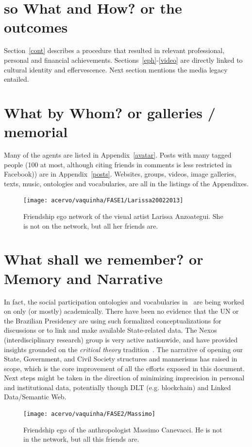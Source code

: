 \documentclass[a4paper]{article}
\begin{document}
\section{so What and How? or the outcomes}
Section~\ref{cont} describes a procedure that resulted in
relevant professional, personal and financial achievements.
Sections~\ref{eph}-\ref{video} are directly linked to cultural identity and effervescence.
Next section mentions the media legacy entailed.

\section{What by Whom? or galleries / memorial}
Many of the agents are listed in Appendix~\ref{avatar}.
Posts with many tagged people (100 at most, although citing friends in comments is less restricted in Facebook)) are in Appendix~\ref{posts}.
Websites, groups, videos, image galleries, texts, music, ontologies and vocabularies, are all in the listings of the Appendixes.

\begin{figure}[!h]
  \centering
    \texttt{[image: acervo/vaquinha/FASE1/Larissa20022013]}
  \caption{Friendship ego network of the visual artist Larissa Anzoategui. She is not on the network, but all her friends are.}
\end{figure}

\section{What shall we remember? or Memory and Narrative}
In fact, the social participation ontologies and vocabularies in~\cite{thesis}
are being worked on only (or mostly) academically.
There have been no evidence that the UN or the Brazilian Presidency are using
such formalized conceptualizations for discussions or to link and make available State-related data.
The Nexos (interdisciplinary research) group is very active nationwide,
and have provided insights grounded on the \emph{critical theory} tradition~\cite{anPhy2,thesis}.
The narrative of opening our State, Government, and Civil Society structures
and mannerisms has raised in scope, which is the core improvement of all
the efforts exposed in this document.
Next steps might be taken in the direction of minimizing imprecision
in personal and institutional data,
potentially though DLT (e.g. blockchain) and Linked Data/Semantic Web.

\begin{figure}[!h]
  \centering
    \texttt{[image: acervo/vaquinha/FASE2/Massimo]}
  \caption{Friendship ego of the anthropologist Massimo Canevacci. He is not in the network, but all this friends are.}
\end{figure}
\end{document}
